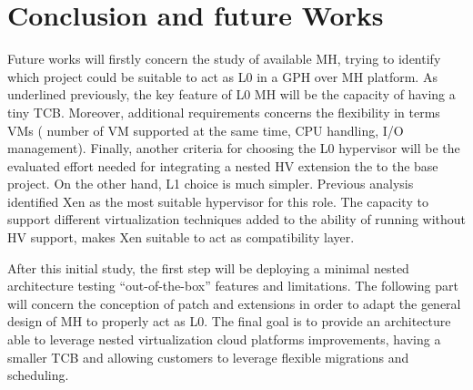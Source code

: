 \documentclass{acm_proc_article-sp} %
\begin{document}

\section{Conclusion and future Works}

Future works will firstly concern the study of available MH, trying to identify which project could be suitable to act as L0 in a GPH over MH platform. As underlined previously, the key feature of L0 MH will be the capacity of having a tiny TCB. Moreover, additional requirements concerns the flexibility in terms VMs ( number of VM supported at the same time, CPU handling, I/O management). Finally, another criteria for choosing the L0 hypervisor will be the evaluated effort needed for integrating a nested HV extension the to the base project.
On the other hand, L1 choice is much simpler. Previous analysis identified Xen as the most suitable hypervisor for this role. The capacity to support different virtualization techniques added to the ability of running without HV support, makes Xen suitable to act as compatibility layer. 

After this initial study, the first step will be deploying a minimal nested architecture testing ``out-of-the-box'' features and limitations. The following part will concern the conception of patch and extensions in order to adapt the general design of MH to properly act as L0.
The final goal is to provide an architecture able to leverage nested virtualization cloud platforms improvements, having a smaller TCB and allowing customers to leverage flexible migrations and scheduling.


\printbibliography
\end{document}
